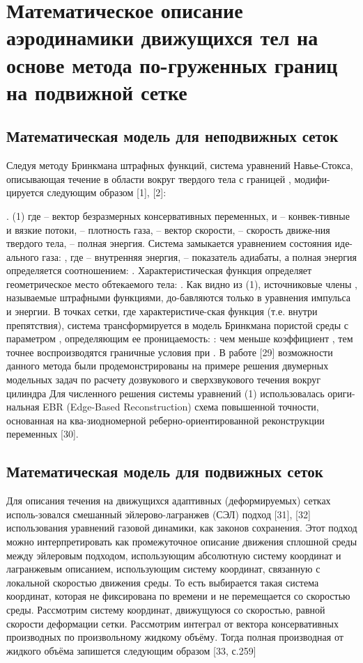 \chapter{Математическое описание аэродинамики движущихся тел на основе метода по-груженных границ на подвижной сетке} \label{ch:ch1}

\section{Математическая модель для неподвижных сеток} \label{sec:ch1/sec1}

	Следуя методу Бринкмана штрафных функций, система уравнений Навье-Стокса, описывающая течение в области   вокруг твердого тела   с границей  , модифи-цируется следующим образом [1], [2]:

.	(1)
где   – вектор безразмерных консервативных переменных,   и   – конвек-тивные и вязкие потоки,   – плотность газа,   – вектор скорости,   – скорость движе-ния твердого тела,   – полная энергия. Система замыкается уравнением состояния иде-ального газа: , где   – внутренняя энергия,   – показатель адиабаты, а полная энергия определяется соотношением:  .
Характеристическая функция   определяет геометрическое место обтекаемого тела:
.
Как видно из (1), источниковые члены  , называемые штрафными функциями, до-бавляются только в уравнения импульса и энергии. В точках сетки, где характеристиче-ская функция   (т.е. внутри препятствия), система трансформируется в модель Бринкмана пористой среды с параметром  , определяющим ее проницаемость:  : чем меньше коэффициент  , тем точнее воспроизводятся граничные условия при  .
В работе [29] возможности данного метода были продемонстрированы на примере решения двумерных модельных задач по расчету дозвукового и сверхзвукового течения вокруг цилиндра Для численного решения системы уравнений (1) использовалась ориги-нальная EBR (Edge-Based Reconstruction) схема повышенной точности, основанная на ква-зиодномерной реберно-ориентированной реконструкции переменных [30].

\section{Математическая модель для подвижных сеток}
Для описания течения на движущихся адаптивных (деформируемых) сетках исполь-зовался смешанный эйлерово-лагранжев (СЭЛ) подход [31], [32] использования уравнений газовой динамики, как законов сохранения. Этот подход можно интерпретировать как промежуточное описание движения сплошной среды между эйлеровым подходом, использующим абсолютную систему координат и лагранжевым описанием, использующим систему координат, связанную с локальной скоростью движения среды. То есть выбирается такая система координат, которая не фиксирована по времени и не перемещается со скоростью среды. 
Рассмотрим систему координат, движущуюся со скоростью, равной скорости деформации сетки. Рассмотрим интеграл от вектора консервативных производных по произвольному жидкому объёму. Тогда полная производная от жидкого объёма запишется следующим образом [33, с.259]

